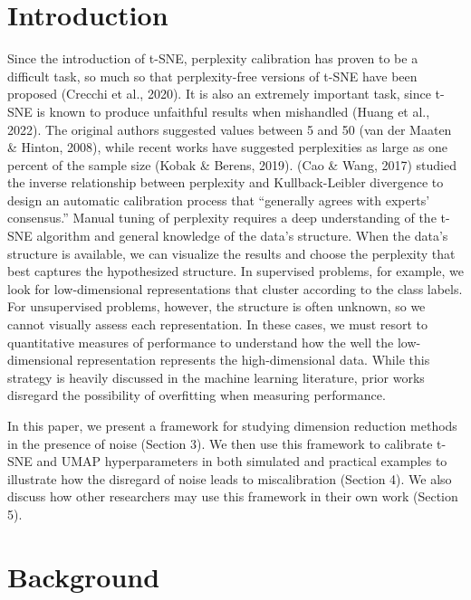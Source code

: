 \documentclass[webpdf,modern,large,namedate]{oup-authoring-template}
\theoremstyle{thmstyleone}%
\theoremstyle{thmstyletwo}%
\theoremstyle{thmstylethree}%
\begin{document}
\section{Introduction}
Since the introduction of t-SNE, perplexity calibration has proven to be a difficult task, so much so that perplexity-free versions of t-SNE have been proposed (Crecchi et al., 2020). It is also an extremely important task, since t-SNE is known to produce unfaithful results when mishandled (Huang et al., 2022). The original authors suggested values between 5 and 50 (van der Maaten \& Hinton, 2008), while recent works have suggested perplexities as large as one percent of the sample size (Kobak \& Berens, 2019). (Cao \& Wang, 2017) studied the inverse relationship between perplexity and Kullback-Leibler divergence to design an automatic calibration process that ``generally agrees with experts' consensus.'' Manual tuning of perplexity requires a deep understanding of the t-SNE algorithm and general knowledge of the data's structure. When the data's structure is available, we can visualize the results and choose the perplexity that best captures the hypothesized structure. In supervised problems, for example, we look for low-dimensional representations that cluster according to the class labels. For unsupervised problems, however, the structure is often unknown, so we cannot visually assess each representation. In these cases, we must resort to quantitative measures of performance to understand how the well the low-dimensional representation represents the high-dimensional data. While this strategy is heavily discussed in the machine learning literature, prior works disregard the possibility of overfitting when measuring performance.

In this paper, we present a framework for studying dimension reduction methods in the presence of noise (Section 3). We then use this framework to calibrate t-SNE and UMAP hyperparameters in both simulated and practical examples to illustrate how the disregard of noise leads to miscalibration (Section 4). We also discuss how other researchers may use this framework in their own work (Section 5).

\section{Background}
\end{document}
